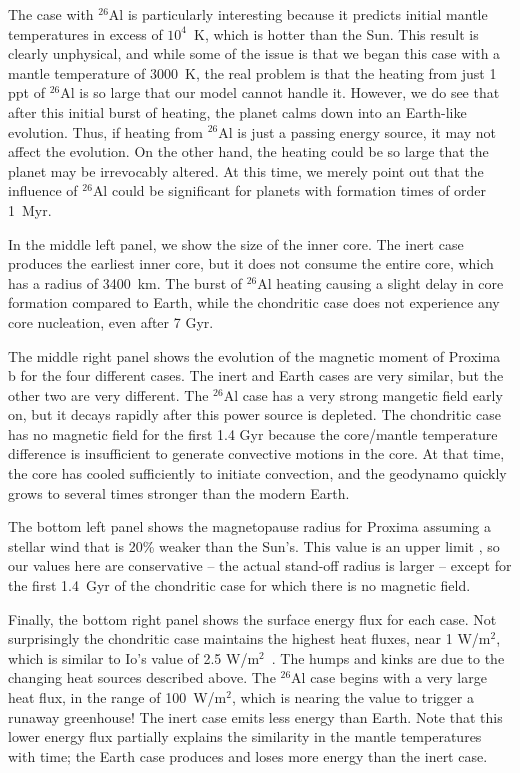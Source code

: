 \documentclass[preprint,12pt]{aastex}
\begin{document}
The case with $^{26}$Al is particularly interesting because it
predicts initial mantle temperatures in excess of $10^4$~K, which is
hotter than the Sun. This result is clearly unphysical, and while some of the
issue is that we began this case with a mantle temperature of 3000~K,
the real problem is that the heating from just 1 ppt of $^{26}$Al is
so large that our model cannot handle it. However, we do see that
after this initial burst of heating, the planet calms down into an
Earth-like evolution. Thus, if heating from $^{26}$Al is just a
passing energy source, it may not affect the evolution. On the other
hand, the heating could be so large that the planet may be irrevocably
altered. At this time, we merely point out that the influence of
$^{26}$Al could be significant for planets with formation times of
order 1~Myr.

In the middle left panel, we show the size of the inner core. The
inert case produces the earliest inner core, but it does not consume the
entire core, which has a radius of 3400~km. The burst of $^{26}$Al
heating causing a slight delay in core formation compared to Earth,
while the chondritic case does not experience any core nucleation, even
after 7 Gyr.

The middle right panel shows the evolution of the magnetic moment of
Proxima b for the four different cases. The inert and Earth cases are
very similar, but the other two are very different. The $^{26}$Al case
has a very strong mangetic field early on, but it decays rapidly after
this power source is depleted. The chondritic case has no magnetic
field for the first 1.4 Gyr because the core/mantle temperature
difference is insufficient to generate convective motions in the
core. At that time, the core has cooled sufficiently to initiate
convection, and the geodynamo quickly grows to several times stronger
than the modern Earth.

The bottom left panel shows the magnetopause radius for Proxima
assuming a stellar wind that is 20\% weaker than the Sun's. This value
is an upper limit \citep{Wood01}, so our values here are conservative
-- the actual stand-off radius is larger -- except for the first
1.4~Gyr of the chondritic case for which there is no magnetic field.

Finally, the bottom right panel shows the surface energy flux for each
case. Not surprisingly the chondritic case maintains the highest heat
fluxes, near 1 W/m$^2$, which is similar to Io's value of 2.5
W/m$^2$~\citep{Veeder94}. The humps and kinks are due to the changing
heat sources described above. The $^{26}$Al case begins with a very
large heat flux, in the range of 100~W/m$^2$, which is nearing the
value to trigger a runaway greenhouse! The inert case emits less
energy than Earth. Note that this lower energy flux partially explains
the similarity in the mantle temperatures with time; the Earth case
produces and loses more energy than the inert case.
\end{document}
